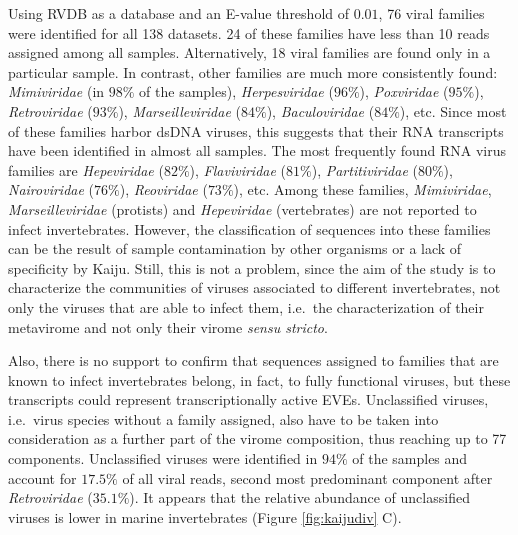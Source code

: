 \documentclass[
  openany]{book}
\begin{document}
Using RVDB as a database and an E-value threshold of \(0.01\), 76 viral families were identified for all 138 datasets. 24 of these families have less than 10 reads assigned among all samples. Alternatively, 18 viral families are found only in a particular sample. In contrast, other families are much more consistently found: \emph{Mimiviridae} (in \(98\%\) of the samples), \emph{Herpesviridae} (\(96\%\)), \emph{Poxviridae} (\(95\%\)), \emph{Retroviridae} (\(93\%\)), \emph{Marseilleviridae} (\(84\%\)), \emph{Baculoviridae} (\(84\%\)), etc. Since most of these families harbor dsDNA viruses, this suggests that their RNA transcripts have been identified in almost all samples. The most frequently found RNA virus families are \emph{Hepeviridae} (\(82\%\)), \emph{Flaviviridae} (\(81\%\)), \emph{Partitiviridae} (\(80\%\)), \emph{Nairoviridae} (\(76\%\)), \emph{Reoviridae} (\(73\%\)), etc. Among these families, \emph{Mimiviridae}, \emph{Marseilleviridae} (protists) and \emph{Hepeviridae} (vertebrates) are not reported to infect invertebrates. However, the classification of sequences into these families can be the result of sample contamination by other organisms or a lack of specificity by Kaiju. Still, this is not a problem, since the aim of the study is to characterize the communities of viruses associated to different invertebrates, not only the viruses that are able to infect them, i.e.~the characterization of their metavirome and not only their virome \emph{sensu stricto}.

Also, there is no support to confirm that sequences assigned to families that are known to infect invertebrates belong, in fact, to fully functional viruses, but these transcripts could represent transcriptionally active EVEs. Unclassified viruses, i.e.~virus species without a family assigned, also have to be taken into consideration as a further part of the virome composition, thus reaching up to 77 components. Unclassified viruses were identified in \(94\%\) of the samples and account for \(17.5\%\) of all viral reads, second most predominant component after \emph{Retroviridae} (\(35.1\%\)). It appears that the relative abundance of unclassified viruses is lower in marine invertebrates (Figure \ref{fig:kaijudiv} C).
\end{document}
